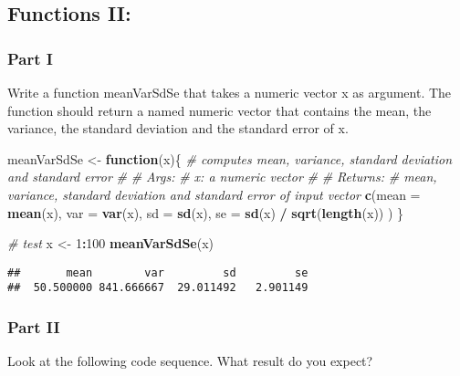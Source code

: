 \documentclass[12,]{article}
\newenvironment{Shaded}{\begin{snugshade}}{\end{snugshade}}
\newcommand{\KeywordTok}[1]{\textcolor[rgb]{0.13,0.29,0.53}{\textbf{#1}}}
\newcommand{\DataTypeTok}[1]{\textcolor[rgb]{0.13,0.29,0.53}{#1}}
\newcommand{\DecValTok}[1]{\textcolor[rgb]{0.00,0.00,0.81}{#1}}
\newcommand{\StringTok}[1]{\textcolor[rgb]{0.31,0.60,0.02}{#1}}
\newcommand{\CommentTok}[1]{\textcolor[rgb]{0.56,0.35,0.01}{\textit{#1}}}
\newcommand{\ControlFlowTok}[1]{\textcolor[rgb]{0.13,0.29,0.53}{\textbf{#1}}}
\newcommand{\OperatorTok}[1]{\textcolor[rgb]{0.81,0.36,0.00}{\textbf{#1}}}
\newcommand{\NormalTok}[1]{#1}
\begin{document}
\subsection{Functions II:}\label{functions-ii}

\subsubsection*{Part I}\label{part-i}

Write a function meanVarSdSe that takes a numeric vector x as argument.
The function should return a named numeric vector that contains the
mean, the variance, the standard deviation and the standard error of x.

\begin{Shaded}
\begin{Highlighting}[]
\NormalTok{meanVarSdSe <-}\StringTok{ }\ControlFlowTok{function}\NormalTok{(x)\{}
  \CommentTok{# computes mean, variance, standard deviation and standard error }
  \CommentTok{#}
  \CommentTok{# Args:}
  \CommentTok{#   x: a numeric vector}
  \CommentTok{#}
  \CommentTok{# Returns:}
  \CommentTok{#   mean, variance, standard deviation and standard error of input vector}
  \KeywordTok{c}\NormalTok{(}\DataTypeTok{mean =} \KeywordTok{mean}\NormalTok{(x),}
    \DataTypeTok{var =} \KeywordTok{var}\NormalTok{(x),}
    \DataTypeTok{sd =} \KeywordTok{sd}\NormalTok{(x),}
    \DataTypeTok{se =} \KeywordTok{sd}\NormalTok{(x) }\OperatorTok{/}\StringTok{ }\KeywordTok{sqrt}\NormalTok{(}\KeywordTok{length}\NormalTok{(x))}
\NormalTok{  )}
\NormalTok{\}}

\CommentTok{# test}
\NormalTok{x <-}\StringTok{ }\DecValTok{1}\OperatorTok{:}\DecValTok{100}
\KeywordTok{meanVarSdSe}\NormalTok{(x)}
\end{Highlighting}
\end{Shaded}

\begin{verbatim}
##       mean        var         sd         se
##  50.500000 841.666667  29.011492   2.901149
\end{verbatim}

\subsubsection*{Part II}\label{part-ii}

Look at the following code sequence. What result do you expect?
\end{document}

